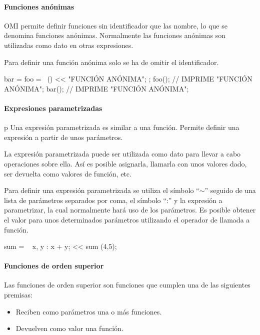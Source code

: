 \paragraph{Funciones anónimas}
OMI permite definir funciones sin identificador que las nombre, lo que se denomina funciones 
anónimas. Normalmente las funciones anónimas son utilizadas
como dato en otras expresiones. 

Para definir una función anónima solo se ha de omitir el identificador. \\


\begin{myverbatim} 
   bar = foo = ~() { << "FUNCIÓN ANÓNIMA"; };
   foo(); // IMPRIME "FUNCIÓN ANÓNIMA"; 
   bar(); // IMPRIME "FUNCIÓN ANÓNIMA"; 
\end{myverbatim}



\paragraph{Expresiones parametrizadas}
p
Una expresión parametrizada es similar a una función. Permite definir una expresión a partir de unos parámetros. 

La expresión parametrizada puede ser utilizada como dato para llevar a cabo operaciones sobre ella. Así es posible asignarla, 
llamarla con unos valores dado, ser devuelta como valores de función, etc.

Para definir una expresión parametrizada se utiliza el símbolo ``$\sim$'' seguido de una lista de parámetros separados por coma, el símbolo ``:'' y la expresión 
a parametrizar, la cual normalmente hará uso de los parámetros. Es posible obtener el valor para unos determinados parámetros utilizando 
el operador de llamada a función. \\

\begin{myverbatim} 
   sum = ~ x, y : x + y;
   << sum (4,5); 
\end{myverbatim}


\paragraph{Funciones de orden superior}

Las funciones de orden superior son funciones que cumplen una de las siguientes premisas:

\begin{itemize}
\item Reciben como parámetros una o más funciones.
\item Devuelven como valor una función.
\end{itemize}


